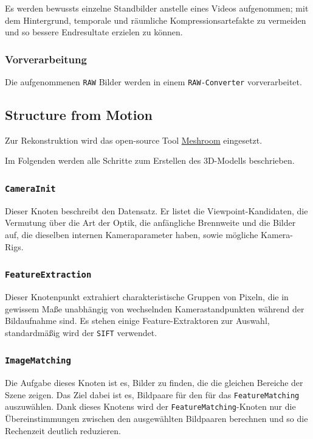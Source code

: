 \documentclass[german,notitlepage,smartquotes]{hgbreport}
\begin{document}
Es werden bewussts einzelne Standbilder anstelle eines Videos aufgenommen; mit dem Hintergrund, temporale und räumliche Kompressionsartefakte zu vermeiden und so bessere Endresultate erzielen zu können.

\subsubsection{Vorverarbeitung}

Die aufgenommenen \texttt{RAW} Bilder werden in einem \texttt{RAW-Converter} vorverarbeitet. 

\clearpage

\subsection{Structure from Motion}

Zur Rekonstruktion wird das open-source Tool \href{https://alicevision.org/}{Meshroom} eingesetzt.

Im Folgenden werden alle Schritte zum Erstellen des 3D-Modells beschrieben.

\subsubsection{\texttt{CameraInit}}

Dieser Knoten beschreibt den Datensatz. Er listet die Viewpoint-Kandidaten, die Vermutung über die Art der Optik, die anfängliche Brennweite und die Bilder auf, die dieselben internen Kameraparameter haben, sowie mögliche Kamera-Rigs.

\subsubsection{\texttt{FeatureExtraction}}

Dieser Knotenpunkt extrahiert charakteristische Gruppen von Pixeln, die in gewissem Maße unabhängig von wechselnden Kamerastandpunkten während der Bildaufnahme sind.
Es stehen einige Feature-Extraktoren zur Auswahl, standardmäßig wird der \texttt{SIFT} verwendet.

\subsubsection{\texttt{ImageMatching}}

Die Aufgabe dieses Knoten ist es, Bilder zu finden, die die gleichen Bereiche der Szene zeigen.
Das Ziel dabei ist es, Bildpaare für den für das \texttt{FeatureMatching} auszuwählen.
Dank dieses Knotens wird der \texttt{FeatureMatching}-Knoten nur die Übereinstimmungen zwischen den ausgewählten Bildpaaren berechnen und so die Rechenzeit deutlich reduzieren.
\end{document}
